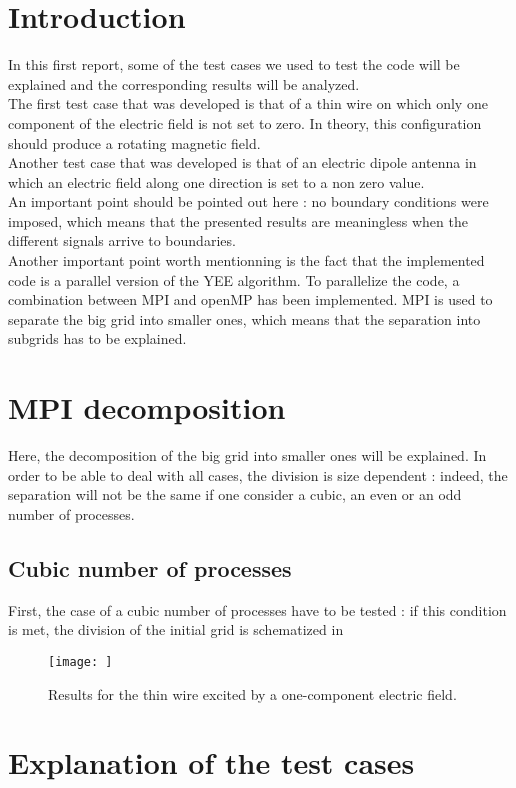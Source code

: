 \documentclass[12 pt]{report}
\begin{document}
\section{Introduction}
In this first report, some of the test cases we used to test the code will be explained and the corresponding results will be analyzed. \\
The first test case that was developed is that of a thin wire on which only one component of the electric field is not set to zero. In theory, this configuration should produce a rotating magnetic field. \\
Another test case that was developed is that of an electric dipole antenna in which an electric field along one direction is set to a non zero value. \\
An important point should be pointed out here : no boundary conditions were imposed, which means that the presented results are meaningless when the different signals arrive to boundaries. \\
Another important point worth mentionning is the fact that the implemented code is a parallel version of the YEE algorithm. To parallelize the code, a combination between MPI and openMP has been implemented. MPI is used to separate the big grid into smaller ones, which means that the separation into subgrids has to be explained.


\section{MPI decomposition}
Here, the decomposition of the big grid into smaller ones will be explained. In order to be able to deal with all cases, the division is size dependent : indeed, the separation will not be the same if one consider a cubic, an even or an odd number of processes.
\subsection{Cubic number of processes}
First, the case of a cubic number of processes have to be tested : if this condition is met, the division of the initial grid is schematized in 
%
\begin{figure}
	\centering
	\texttt{[image: ]}
	\caption{Results for the thin wire excited by a one-component electric field.}
	\label{fig:THINWIRE}
\end{figure}
%


\section{Explanation of the test cases}
\end{document}
